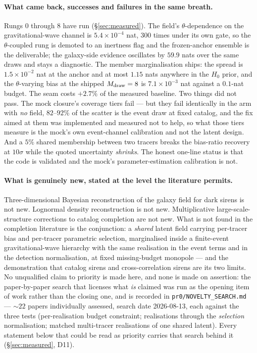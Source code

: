 \documentclass[11pt]{article}
\theoremstyle{definition}
\theoremstyle{remark}
\newcommand{\Mdraw}{M_{\rm draw}}
\begin{document}
\paragraph{What came back, successes and failures in the same breath.} Rungs
$0$ through $8$ have run (\S\ref{sec:measured}). The field's $\theta$-dependence
on the gravitational-wave channel is $5.4\times10^{-4}$ nat, $300$ times under
its own gate, so the $\theta$-coupled rung is demoted to an inertness flag and
the frozen-anchor ensemble is the deliverable; the galaxy-side evidence
oscillates by $59.9$ nats over the same draws and stays a diagnostic. The member
marginalisation ships: the spread is $1.5\times10^{-2}$ nat at the anchor and at
most $1.15$ nats anywhere in the $H_0$ prior, and the $\theta$-varying bias at
the shipped $\Mdraw=8$ is $7.1\times10^{-3}$ nat against a $0.1$-nat budget. The
seam costs $+2.7\%$ of the measured baseline. Two things did not pass. The mock
closure's coverage tiers fail --- but they fail identically in the arm with
\emph{no} field, $82$--$92\%$ of the scatter is the event draw at fixed catalog,
and the fix aimed at them was implemented and measured not to help, so what those
tiers measure is the mock's own event-channel calibration and not the latent
design. And a $5\%$ shared membership between two tracers breaks the bias-ratio
recovery at $10\sigma$ while the quoted uncertainty \emph{shrinks}. The honest
one-line status is that the code is validated and the mock's parameter-estimation
calibration is not.

\paragraph{What is genuinely new, stated at the level the literature permits.}
Three-dimensional Bayesian reconstruction of the galaxy field for dark sirens is
not new. Lognormal density reconstruction is not new. Multiplicative
large-scale-structure corrections to catalog completion are not new. What is not
found in the completion literature is the conjunction: a \emph{shared} latent
field carrying per-tracer bias and per-tracer parametric selection, marginalised
inside a finite-event gravitational-wave hierarchy with the same realisation in
the event terms and in the detection normalisation, at fixed missing-budget
monopole --- and the demonstration that catalog sirens and cross-correlation
sirens are its two limits. No unqualified claim to priority is made here, and
none is made on assertion: the paper-by-paper search that licenses what \emph{is}
claimed was run as the opening item of work rather than the closing one, and is
recorded in \texttt{pr0/NOVELTY\_SEARCH.md} --- $\sim22$ papers individually
assessed, search date 2026-08-13, each against the three tests
(per-realisation budget constraint; realisations through the \emph{selection}
normalisation; matched multi-tracer realisations of one shared latent). Every
statement below that could be read as priority carries that search behind it
(\S\ref{sec:measured}, D11).
\end{document}
